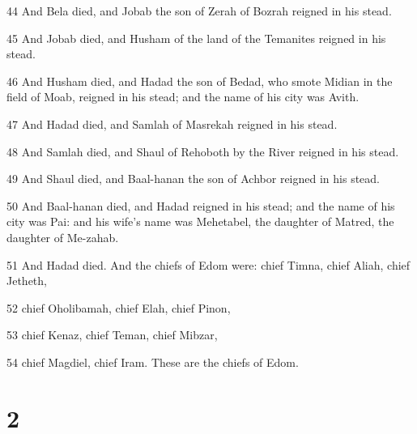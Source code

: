 \par 44 And Bela died, and Jobab the son of Zerah of Bozrah reigned in his stead.
\par 45 And Jobab died, and Husham of the land of the Temanites reigned in his stead.
\par 46 And Husham died, and Hadad the son of Bedad, who smote Midian in the field of Moab, reigned in his stead; and the name of his city was Avith.
\par 47 And Hadad died, and Samlah of Masrekah reigned in his stead.
\par 48 And Samlah died, and Shaul of Rehoboth by the River reigned in his stead.
\par 49 And Shaul died, and Baal-hanan the son of Achbor reigned in his stead.
\par 50 And Baal-hanan died, and Hadad reigned in his stead; and the name of his city was Pai: and his wife's name was Mehetabel, the daughter of Matred, the daughter of Me-zahab.
\par 51 And Hadad died. And the chiefs of Edom were: chief Timna, chief Aliah, chief Jetheth,
\par 52 chief Oholibamah, chief Elah, chief Pinon,
\par 53 chief Kenaz, chief Teman, chief Mibzar,
\par 54 chief Magdiel, chief Iram. These are the chiefs of Edom.

\chapter{2}

